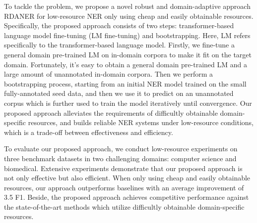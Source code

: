 \documentclass[10pt, conference, compsocconf]{IEEEtran}
\newcommand{\rdaner}{\textsc{RDANER}\xspace}
\begin{document}

To tackle the problem, we propose a novel robust and domain-adaptive approach \rdaner for low-resource NER only using cheap and easily obtainable resources. 
Specifically, the proposed approach consists of two steps: transformer-based language model fine-tuning (LM fine-tuning) and bootstrapping.
Here, LM refers specifically to the transformer-based language model.
Firstly, we fine-tune a general domain pre-trained LM on in-domain corpora to make it
fit on the target domain. Fortunately, it's easy to obtain a general domain pre-trained LM and a large amount of unannotated in-domain corpora.
Then we perform a bootstrapping process, starting from an initial NER model trained on
the small fully-annotated seed data, and then we use it to predict on an unannotated corpus
which is further used to train the model iteratively until convergence.
Our proposed approach alleviates the requirements of difficultly obtainable domain-specific resources, and builds reliable NER systems 
under low-resource conditions, which is a trade-off between effectiveness and efficiency.




To evaluate our proposed approach, we conduct low-resource experiments 
on three benchmark datasets in two challenging domains: computer science and biomedical.
Extensive experiments demonstrate that our proposed approach is not only effective but also efficient.
When only using cheap and easily obtainable resources, our approach outperforms 
baselines with an average improvement of 3.5 F1. Beside, the proposed approach achieves competitive performance against the state-of-the-art
methods which utilize difficultly obtainable domain-specific resources.
\end{document}
